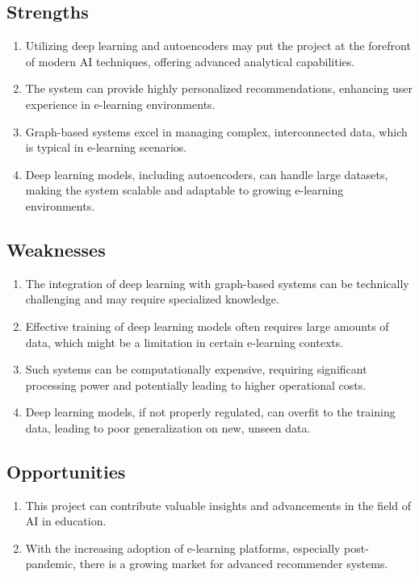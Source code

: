 \subsection{Strengths}
\begin{enumerate}
    \item Utilizing deep learning and autoencoders may put the project at the forefront of modern AI techniques, offering advanced analytical capabilities.
    \item The system can provide highly personalized recommendations, enhancing user experience in e-learning environments.
    \item Graph-based systems excel in managing complex, interconnected data, which is typical in e-learning scenarios.
    \item Deep learning models, including autoencoders, can handle large datasets, making the system scalable and adaptable to growing e-learning environments.
\end{enumerate}
\subsection{Weaknesses}
\begin{enumerate}
    \item The integration of deep learning with graph-based systems can be technically challenging and may require specialized knowledge.
    \item Effective training of deep learning models often requires large amounts of data, which might be a limitation in certain e-learning contexts.
    \item Such systems can be computationally expensive, requiring significant processing power and potentially leading to higher operational costs.
    \item Deep learning models, if not properly regulated, can overfit to the training data, leading to poor generalization on new, unseen data.
\end{enumerate}
\subsection{Opportunities}
\begin{enumerate}
    \item This project can contribute valuable insights and advancements in the field of AI in education.
    \item With the increasing adoption of e-learning platforms, especially post-pandemic, there is a growing market for advanced recommender systems.
\end{enumerate}
